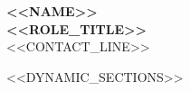 \documentclass[a4paper,<<FONT_SIZE>>]{article}
\begin{document}
\pagestyle{empty}

\noindent
{\centering
{\LARGE \textbf{<<NAME>>}}\\[3pt]
\textbf{ <<ROLE_TITLE>> }\\[3pt]
<<CONTACT_LINE>>\par
}

\vspace{3pt}

<<DYNAMIC_SECTIONS>>
\end{document}
